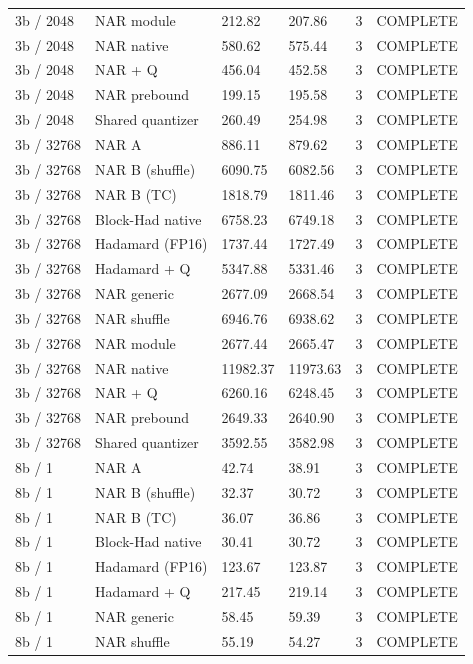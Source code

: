 {\begin{longtable}{llllll}
3b / 2048 & NAR module & 212.82 & 207.86 & 3 & COMPLETE \\
3b / 2048 & NAR native & 580.62 & 575.44 & 3 & COMPLETE \\
3b / 2048 & NAR + Q & 456.04 & 452.58 & 3 & COMPLETE \\
3b / 2048 & NAR prebound & 199.15 & 195.58 & 3 & COMPLETE \\
3b / 2048 & Shared quantizer & 260.49 & 254.98 & 3 & COMPLETE \\
3b / 32768 & NAR A & 886.11 & 879.62 & 3 & COMPLETE \\
3b / 32768 & NAR B (shuffle) & 6090.75 & 6082.56 & 3 & COMPLETE \\
3b / 32768 & NAR B (TC) & 1818.79 & 1811.46 & 3 & COMPLETE \\
3b / 32768 & Block-Had native & 6758.23 & 6749.18 & 3 & COMPLETE \\
3b / 32768 & Hadamard (FP16) & 1737.44 & 1727.49 & 3 & COMPLETE \\
3b / 32768 & Hadamard + Q & 5347.88 & 5331.46 & 3 & COMPLETE \\
3b / 32768 & NAR generic & 2677.09 & 2668.54 & 3 & COMPLETE \\
3b / 32768 & NAR shuffle & 6946.76 & 6938.62 & 3 & COMPLETE \\
3b / 32768 & NAR module & 2677.44 & 2665.47 & 3 & COMPLETE \\
3b / 32768 & NAR native & 11982.37 & 11973.63 & 3 & COMPLETE \\
3b / 32768 & NAR + Q & 6260.16 & 6248.45 & 3 & COMPLETE \\
3b / 32768 & NAR prebound & 2649.33 & 2640.90 & 3 & COMPLETE \\
3b / 32768 & Shared quantizer & 3592.55 & 3582.98 & 3 & COMPLETE \\
8b / 1 & NAR A & 42.74 & 38.91 & 3 & COMPLETE \\
8b / 1 & NAR B (shuffle) & 32.37 & 30.72 & 3 & COMPLETE \\
8b / 1 & NAR B (TC) & 36.07 & 36.86 & 3 & COMPLETE \\
8b / 1 & Block-Had native & 30.41 & 30.72 & 3 & COMPLETE \\
8b / 1 & Hadamard (FP16) & 123.67 & 123.87 & 3 & COMPLETE \\
8b / 1 & Hadamard + Q & 217.45 & 219.14 & 3 & COMPLETE \\
8b / 1 & NAR generic & 58.45 & 59.39 & 3 & COMPLETE \\
8b / 1 & NAR shuffle & 55.19 & 54.27 & 3 & COMPLETE \\

\end{longtable}}
